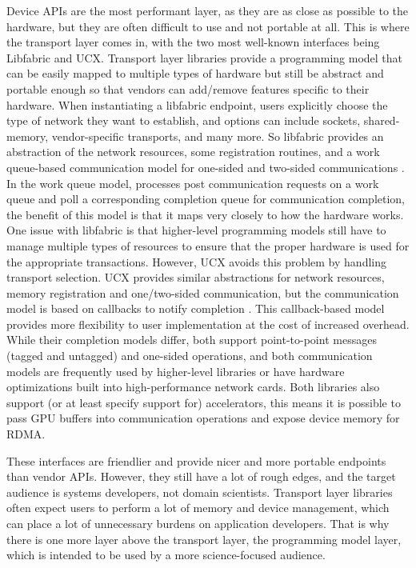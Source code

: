 Device \gls{API}s are the most performant layer, as they are as close as possible to the hardware, but they are often difficult to use and not portable at all.
This is where the transport layer comes in, with the two most well-known interfaces being Libfabric and \gls{UCX}.
Transport layer libraries provide a programming model that can be easily mapped to multiple types of hardware but still be abstract and portable enough so that vendors can add/remove features specific to their hardware.
When instantiating a libfabric endpoint, users explicitly choose the type of network they want to establish, and options can include sockets, shared-memory, vendor-specific transports, and many more.
So libfabric provides an abstraction of the network resources, some registration routines, and a work queue-based communication model for one-sided and two-sided communications \cite{libfabric}.
In the work queue model, processes post communication requests on a work queue and poll a corresponding completion queue for communication completion, the benefit of this model is that it maps very closely to how the hardware works.
One issue with libfabric is that higher-level programming models still have to manage multiple types of resources to ensure that the proper hardware is used for the appropriate transactions. 
However, \gls{UCX} avoids this problem by handling transport selection.
\gls{UCX} provides similar abstractions for network resources, memory registration and one/two-sided communication, but the communication model is based on callbacks to notify completion \cite{shamis2015ucx}.
This callback-based model provides more flexibility to user implementation at the cost of increased overhead.
While their completion models differ, both support point-to-point messages (tagged and untagged) and one-sided operations, and both communication models are frequently used by higher-level libraries or have hardware optimizations built into high-performance network cards.
Both libraries also support (or at least specify support for) accelerators, this means it is possible to pass \gls{GPU} buffers into communication operations and expose device memory for \gls{RDMA}.

These interfaces are friendlier and provide nicer and more portable endpoints than vendor \gls{API}s. 
However, they still have a lot of rough edges, and the target audience is systems developers, not domain scientists.
Transport layer libraries often expect users to perform a lot of memory and device management, which can place a lot of unnecessary burdens on application developers.
That is why there is one more layer above the transport layer, the programming model layer, which is intended to be used by a more science-focused audience.

